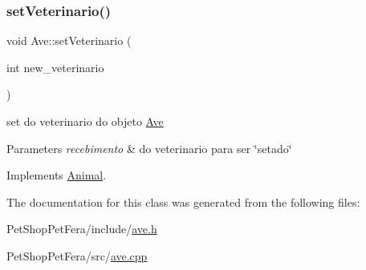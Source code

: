 \mbox{\label{class_ave_a5d351f4be73bf31423b8f55d1b344b14}} 
\subsubsection{\texorpdfstring{setVeterinario()}{setVeterinario()}}
{\footnotesize\ttfamily void Ave\+::set\+Veterinario (\begin{DoxyParamCaption}\item[{int}]{new\+\_\+veterinario }\end{DoxyParamCaption})\hspace{0.3cm}{\ttfamily [virtual]}}



set do veterinario do objeto \mbox{\hyperlink{class_ave}{Ave}} 


\begin{DoxyParams}{Parameters}
{\em recebimento} & do veterinario para ser \char`\"{}setado\char`\"{} \\
\hline
\end{DoxyParams}


Implements \mbox{\hyperlink{class_animal}{Animal}}.



The documentation for this class was generated from the following files\+:\begin{DoxyCompactItemize}
\item 
Pet\+Shop\+Pet\+Fera/include/\mbox{\hyperlink{ave_8h}{ave.\+h}}\item 
Pet\+Shop\+Pet\+Fera/src/\mbox{\hyperlink{ave_8cpp}{ave.\+cpp}}\end{DoxyCompactItemize}
